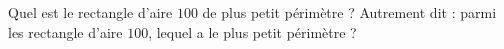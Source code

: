 
\begin{exercice}\label{exoPremiere-0029}

    Quel est le rectangle d'aire \( 100\) de plus petit périmètre ? Autrement dit : parmi les rectangle d'aire \( 100\), lequel a le plus petit périmètre ?

\end{exercice}
